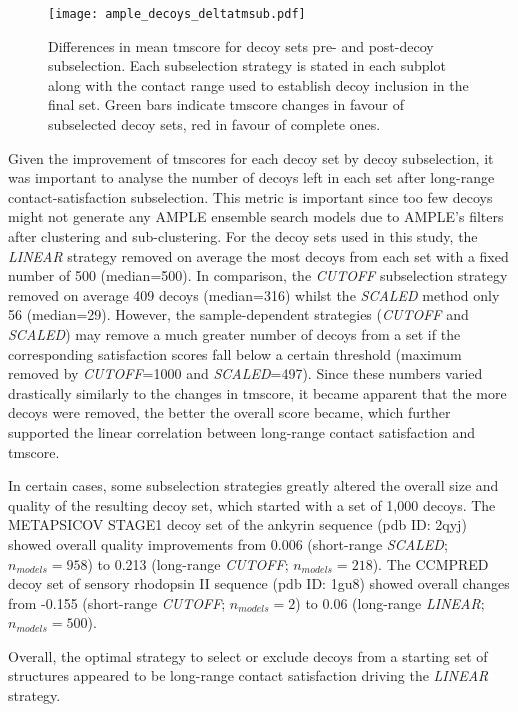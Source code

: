 \begin{figure}[H]
	\centering
	\texttt{[image: ample\_decoys\_deltatmsub.pdf]}
        \caption[TM-score comparison pre- and post-decoy subselection]{Differences in mean \gls{tmscore} for decoy sets pre- and post-decoy subselection. Each subselection strategy is stated in each subplot along with the contact range used to establish decoy inclusion in the final set. Green bars indicate \gls{tmscore} changes in favour of subselected decoy sets, red in favour of complete ones.}
	\label{fig:ample_decoys_deltatmsub}
\end{figure}

Given the improvement of \gls{tmscore}s for each decoy set by decoy subselection, it was important to analyse the number of decoys left in each set after long-range contact-satisfaction subselection. This metric is important since too few decoys might not generate any AMPLE ensemble search models due to AMPLE's filters after clustering and sub-clustering. For the decoy sets used in this study, the \textit{LINEAR} strategy removed on average the most decoys from each set with a fixed number of 500 (median=500). In comparison, the \textit{CUTOFF} subselection strategy removed on average 409 decoys (median=316) whilst the \textit{SCALED} method only 56 (median=29). However, the sample-dependent strategies (\textit{CUTOFF} and \textit{SCALED}) may remove a much greater number of decoys from a set if the corresponding satisfaction scores fall below a certain threshold (maximum removed by \textit{CUTOFF}=1000 and \textit{SCALED}=497). Since these numbers varied drastically similarly to the changes in \gls{tmscore}, it became apparent that the more decoys were removed, the better the overall score became, which further supported the linear correlation between long-range contact satisfaction and \gls{tmscore}.

In certain cases, some subselection strategies greatly altered the overall size and quality of the resulting decoy set, which started with a set of 1,000 decoys. The METAPSICOV STAGE1 decoy set of the ankyrin sequence (\gls{pdb} ID: 2qyj) showed overall quality improvements from 0.006 (short-range \textit{SCALED}; $n_{models}=958$) to 0.213 (long-range \textit{CUTOFF}; $n_{models}=218$). The CCMPRED decoy set of sensory rhodopsin II sequence (\gls{pdb} ID: 1gu8) showed overall changes from -0.155 (short-range \textit{CUTOFF}; $n_{models}=2$) to 0.06 (long-range \textit{LINEAR}; $n_{models}=500$).

Overall, the optimal strategy to select or exclude decoys from a starting set of structures appeared to be long-range contact satisfaction driving the \textit{LINEAR} strategy.


